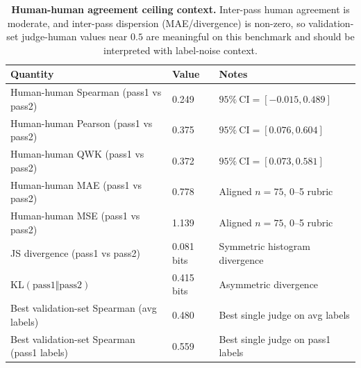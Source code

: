 \documentclass{article}
\begin{document}
\begin{table}[t]
  \centering
  \scriptsize
  \setlength{\tabcolsep}{2pt}%
  \begin{tabular}{@{}p{}p{}p{}@{}}
    \toprule
    \textbf{Quantity}                           & \textbf{Value} & \textbf{Notes}                      \\
    \midrule
    Human-human Spearman (pass1 vs pass2)       & 0.249          & \(95\%\ \text{CI}=[-0.015, 0.489]\) \\
    Human-human Pearson (pass1 vs pass2)        & 0.375          & \(95\%\ \text{CI}=[0.076, 0.604]\)  \\
    Human-human QWK (pass1 vs pass2)            & 0.372          & \(95\%\ \text{CI}=[0.073, 0.581]\)  \\
    Human-human MAE (pass1 vs pass2)            & 0.778          & Aligned \(n=75\), 0--5 rubric       \\
    Human-human MSE (pass1 vs pass2)            & 1.139          & Aligned \(n=75\), 0--5 rubric       \\
    JS divergence (pass1 vs pass2)              & 0.081 bits     & Symmetric histogram divergence      \\
    KL\((\text{pass1}\Vert\text{pass2})\)       & 0.415 bits     & Asymmetric divergence               \\
    Best validation-set Spearman (avg labels)   & 0.480          & Best single judge on avg labels     \\
    Best validation-set Spearman (pass1 labels) & 0.559          & Best single judge on pass1 labels   \\
    \bottomrule
  \end{tabular}
  \caption{\textbf{Human-human agreement ceiling context.}
    Inter-pass human agreement is moderate, and inter-pass dispersion (MAE/divergence) is non-zero, so validation-set judge-human values near \(0.5\) are meaningful on this benchmark and should be interpreted with label-noise context.}
  \label{tab:app-human-human-ceiling}
\end{table}
\end{document}
